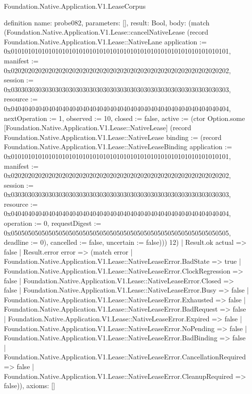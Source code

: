 \begin{lexlean}{Foundation.Native.Application.V1.LeaseCorpus}
\begin{semanticmodule}
definition{
  name: probe082,
  parameters: [],
  result: Bool,
  body: (match (Foundation.Native.Application.V1.Lease::cancelNativeLease (record Foundation.Native.Application.V1.Lease::NativeLane {application := 0x0101010101010101010101010101010101010101010101010101010101010101, manifest := 0x0202020202020202020202020202020202020202020202020202020202020202, session := 0x0303030303030303030303030303030303030303030303030303030303030303, resource := 0x0404040404040404040404040404040404040404040404040404040404040404, nextOperation := 1, observed := 10, closed := false, active := (ctor Option.some [Foundation.Native.Application.V1.Lease::NativeLease] (record Foundation.Native.Application.V1.Lease::NativeLease {binding := (record Foundation.Native.Application.V1.Lease::NativeLeaseBinding {application := 0x0101010101010101010101010101010101010101010101010101010101010101, manifest := 0x0202020202020202020202020202020202020202020202020202020202020202, session := 0x0303030303030303030303030303030303030303030303030303030303030303, resource := 0x0404040404040404040404040404040404040404040404040404040404040404, operation := 0, requestDigest := 0x0505050505050505050505050505050505050505050505050505050505050505, deadline := 0}), cancelled := false, uncertain := false}))}) 12)
    | Result.ok actual => false
    | Result.error error => (match error
      | Foundation.Native.Application.V1.Lease::NativeLeaseError.BadState => true
      | Foundation.Native.Application.V1.Lease::NativeLeaseError.ClockRegression => false
      | Foundation.Native.Application.V1.Lease::NativeLeaseError.Closed => false
      | Foundation.Native.Application.V1.Lease::NativeLeaseError.Busy => false
      | Foundation.Native.Application.V1.Lease::NativeLeaseError.Exhausted => false
      | Foundation.Native.Application.V1.Lease::NativeLeaseError.BadRequest => false
      | Foundation.Native.Application.V1.Lease::NativeLeaseError.Expired => false
      | Foundation.Native.Application.V1.Lease::NativeLeaseError.NoPending => false
      | Foundation.Native.Application.V1.Lease::NativeLeaseError.BadBinding => false
      | Foundation.Native.Application.V1.Lease::NativeLeaseError.CancellationRequired => false
      | Foundation.Native.Application.V1.Lease::NativeLeaseError.CleanupRequired => false)),
  axioms: []
}


\end{semanticmodule}
\end{lexlean}
